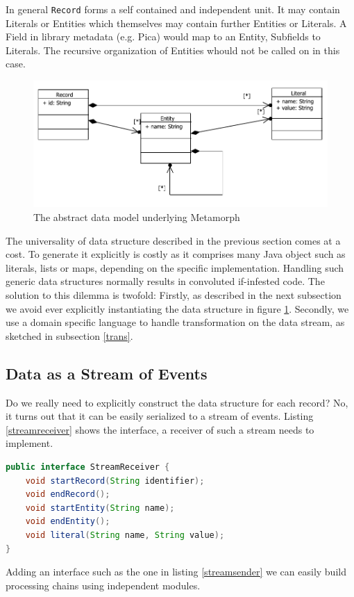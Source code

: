 \documentclass[12pt,a4paper]{article}
\begin{document}
In general {\tt Record} forms a self contained and independent unit. It may contain Literals or Entities which themselves may contain further Entities or Literals. A Field in library metadata (e.g. Pica) would map to an Entity, Subfields to Literals. The recursive organization of Entities whould not be called on in this case.
\begin{figure}[htp]
\centering
\includegraphics[width=.90\textwidth]{figures/record2_class}
\caption{The abstract data model underlying Metamorph}\label{fig:record2_class}
\end{figure}

The universality of data structure described in the previous section comes at a cost. To generate it explicitly is costly as it comprises many Java object such as literals, lists or maps, depending on the specific implementation. Handling such generic data structures normally results in convoluted if-infested code.
The solution to this dilemma is twofold: Firstly, as described in the next subsection we avoid ever explicitly instantiating the data structure in figure \ref{fig:record2_class}. Secondly, we use a domain specific language to handle transformation on the data stream, as sketched in subsection \ref{trans}.

\subsection{Data as a Stream of Events}

 Do we really need to explicitly construct the data structure for each record? No, it turns out that it can be easily serialized to a stream of events. Listing \ref{streamreceiver} shows the interface, a receiver of such a stream needs to implement.
\begin{lstlisting}[float=htb, label=streamreceiver,caption=The interface used to serialize the data structure in figure \ref{fig:record2_class}., language=Java]
public interface StreamReceiver {
	void startRecord(String identifier);
	void endRecord();
	void startEntity(String name);
	void endEntity();
	void literal(String name, String value);
}
\end{lstlisting}
Adding an interface such as the one in listing \ref{streamsender} we can easily build processing chains using independent modules.
\end{document}
